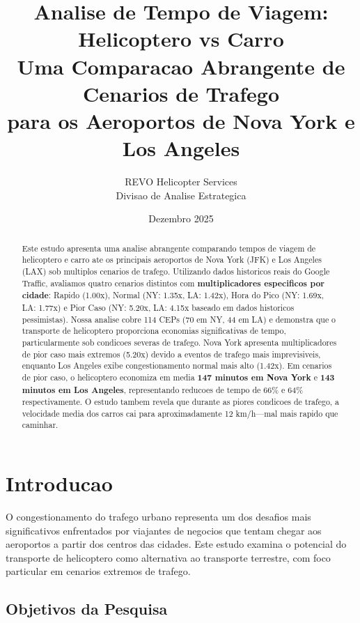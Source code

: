 \documentclass[12pt,a4paper]{article}
\title{\textbf{Analise de Tempo de Viagem: Helicoptero vs Carro\\
Uma Comparacao Abrangente de Cenarios de Trafego\\
para os Aeroportos de Nova York e Los Angeles}}
\author{REVO Helicopter Services\\
Divisao de Analise Estrategica}
\date{Dezembro 2025}
\begin{document}
\maketitle

\begin{abstract}
Este estudo apresenta uma analise abrangente comparando tempos de viagem de helicoptero e carro ate os principais aeroportos de Nova York (JFK) e Los Angeles (LAX) sob multiplos cenarios de trafego. Utilizando dados historicos reais do Google Traffic, avaliamos quatro cenarios distintos com \textbf{multiplicadores especificos por cidade}: Rapido (1.00x), Normal (NY: 1.35x, LA: 1.42x), Hora do Pico (NY: 1.69x, LA: 1.77x) e Pior Caso (NY: 5.20x, LA: 4.15x baseado em dados historicos pessimistas). Nossa analise cobre 114 CEPs (70 em NY, 44 em LA) e demonstra que o transporte de helicoptero proporciona economias significativas de tempo, particularmente sob condicoes severas de trafego. Nova York apresenta multiplicadores de pior caso mais extremos (5.20x) devido a eventos de trafego mais imprevisiveis, enquanto Los Angeles exibe congestionamento normal mais alto (1.42x). Em cenarios de pior caso, o helicoptero economiza em media \textbf{147 minutos em Nova York} e \textbf{143 minutos em Los Angeles}, representando reducoes de tempo de 66\% e 64\% respectivamente. O estudo tambem revela que durante as piores condicoes de trafego, a velocidade media dos carros cai para aproximadamente 12 km/h---mal mais rapido que caminhar.
\end{abstract}

\newpage
\tableofcontents
\newpage

\section{Introducao}

O congestionamento do trafego urbano representa um dos desafios mais significativos enfrentados por viajantes de negocios que tentam chegar aos aeroportos a partir dos centros das cidades. Este estudo examina o potencial do transporte de helicoptero como alternativa ao transporte terrestre, com foco particular em cenarios extremos de trafego.

\subsection{Objetivos da Pesquisa}
\end{document}
